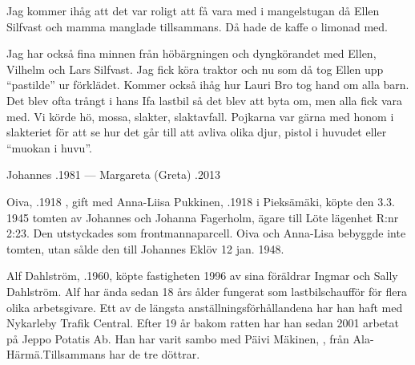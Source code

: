 Jag kommer ihåg att det var roligt att få vara med i mangelstugan då Ellen Silfvast och mamma manglade tillsammans. Då hade de kaffe o limonad med.

Jag har också fina minnen från höbärgningen och dyngkörandet med Ellen, Vilhelm och Lars Silfvast. Jag fick köra traktor och nu som då tog Ellen upp ``pastilde'' ur förklädet. Kommer också ihåg hur Lauri Bro tog hand om alla barn. Det blev ofta trångt i hans Ifa lastbil så det blev att byta om, men alla fick vara med. Vi körde hö, mossa, slakter, slaktavfall. Pojkarna var gärna med honom i slakteriet för att se hur det går till att avliva olika djur, pistol i huvudet eller ``muokan i huvu''.

Johannes .1981  ---  Margareta (Greta) .2013


%
Oiva, .1918 , gift med Anna-Liisa Pukkinen, .1918 i Pieksämäki, köpte den 3.3. 1945 tomten av Johannes och Johanna Fagerholm, ägare till Löte lägenhet R:nr 2:23. Den utstyckades som frontmannaparcell. Oiva och Anna-Lisa bebyggde inte tomten, utan sålde den till Johannes Eklöv 12 jan. 1948.



%



%
Alf Dahlström, .1960, köpte fastigheten 1996 av sina föräldrar Ingmar och Sally Dahlström. Alf har ända sedan 18 års ålder fungerat som lastbilschaufför för flera olika arbetsgivare. Ett av de längsta anställningsförhållandena har han haft med Nykarleby Trafik Central. Efter 19 år bakom ratten har han sedan 2001 arbetat på Jeppo Potatis Ab. Han har varit sambo med Päivi Mäkinen, , från Ala-Härmä.Tillsammans har de tre döttrar.
\begin{jhchildren}
  \item {}
  \item {}
  \item {}
\end{jhchildren}



